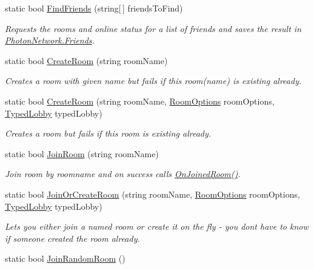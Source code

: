 \begin{DoxyCompactItemize}
static bool \hyperlink{class_photon_network_a5c08f89cdf5766c1b69d5b7b8786b734}{Find\+Friends} (string\mbox{[}$\,$\mbox{]} friends\+To\+Find)
\begin{DoxyCompactList}\small\item\em Requests the rooms and online status for a list of friends and saves the result in \hyperlink{class_photon_network_afd22fd553d52fdc63e975c32ea47514f}{Photon\+Network.\+Friends}. \end{DoxyCompactList}\item 
static bool \hyperlink{class_photon_network_a5ab80136622c2ae46b0e4f766e489d74}{Create\+Room} (string room\+Name)
\begin{DoxyCompactList}\small\item\em Creates a room with given name but fails if this room(name) is existing already. \end{DoxyCompactList}\item 
static bool \hyperlink{class_photon_network_a08435c2d064fd6a85e51e1520e5a63d8}{Create\+Room} (string room\+Name, \hyperlink{class_room_options}{Room\+Options} room\+Options, \hyperlink{class_typed_lobby}{Typed\+Lobby} typed\+Lobby)
\begin{DoxyCompactList}\small\item\em Creates a room but fails if this room is existing already. \end{DoxyCompactList}\item 
static bool \hyperlink{class_photon_network_a8c94dd51fe8e8986117b499161ff4461}{Join\+Room} (string room\+Name)
\begin{DoxyCompactList}\small\item\em Join room by roomname and on success calls \hyperlink{group__public_api_ggaf30bbea51cc8c4b1ddc239d1c5c1468fa3f4efa6b23780a66a9462d8634cca4c8}{On\+Joined\+Room()}. \end{DoxyCompactList}\item 
static bool \hyperlink{class_photon_network_a902344ffd109a23f1a0606599af5eb96}{Join\+Or\+Create\+Room} (string room\+Name, \hyperlink{class_room_options}{Room\+Options} room\+Options, \hyperlink{class_typed_lobby}{Typed\+Lobby} typed\+Lobby)
\begin{DoxyCompactList}\small\item\em Lets you either join a named room or create it on the fly -\/ you don\textquotesingle{}t have to know if someone created the room already. \end{DoxyCompactList}\item 
static bool \hyperlink{class_photon_network_aa9a112ccaaf71a296b823e9637584445}{Join\+Random\+Room} ()

\end{DoxyCompactItemize}
